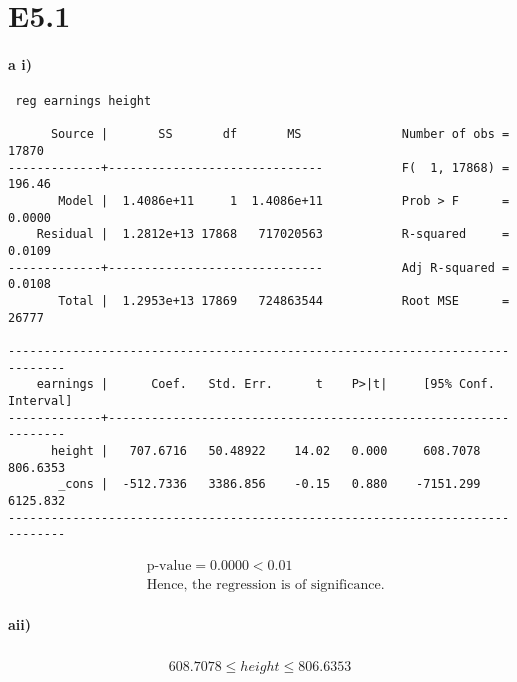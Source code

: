 \documentclass[letterpaper,12pt,titlepage,oneside,final]{book}
\begin{document}
\section*{E5.1}
\paragraph{a i)}
\begin{verbatim}
 reg earnings height

      Source |       SS       df       MS              Number of obs =   17870
-------------+------------------------------           F(  1, 17868) =  196.46
       Model |  1.4086e+11     1  1.4086e+11           Prob > F      =  0.0000
    Residual |  1.2812e+13 17868   717020563           R-squared     =  0.0109
-------------+------------------------------           Adj R-squared =  0.0108
       Total |  1.2953e+13 17869   724863544           Root MSE      =   26777

------------------------------------------------------------------------------
    earnings |      Coef.   Std. Err.      t    P>|t|     [95% Conf. Interval]
-------------+----------------------------------------------------------------
      height |   707.6716   50.48922    14.02   0.000     608.7078    806.6353
       _cons |  -512.7336   3386.856    -0.15   0.880    -7151.299    6125.832
------------------------------------------------------------------------------

\end{verbatim}
\begin{align*}
&\text{p-value} =  0.0000 < 0.01\\
&\text{Hence, the regression is of significance.}
\end{align*}

\paragraph{aii)}
\begin{align*}
608.7078 \leq \widehat{height} \leq 806.6353
\end{align*}
\end{document}
